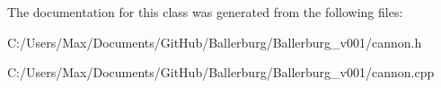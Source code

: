 The documentation for this class was generated from the following files\+:\begin{DoxyCompactItemize}
\item 
C\+:/\+Users/\+Max/\+Documents/\+Git\+Hub/\+Ballerburg/\+Ballerburg\+\_\+v001/cannon.\+h\item 
C\+:/\+Users/\+Max/\+Documents/\+Git\+Hub/\+Ballerburg/\+Ballerburg\+\_\+v001/cannon.\+cpp\end{DoxyCompactItemize}
